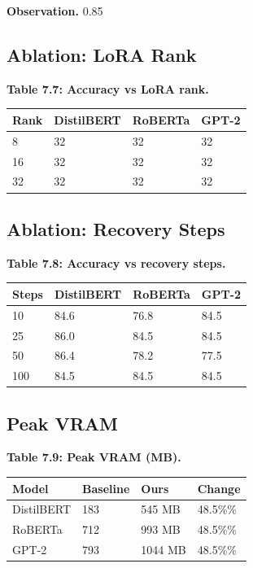 \textbf{Observation.} 0.85

\subsection{Ablation: LoRA Rank}

\textbf{Table 7.7: Accuracy vs LoRA rank.}

\begin{table}[H]
\centering
\small
\begin{tabular}{llll}
\toprule
\textbf{Rank} & \textbf{DistilBERT} & \textbf{RoBERTa} & \textbf{GPT-2} \\
\midrule
8 & 32 & 32 & 32 \\
16 & 32 & 32 & 32 \\
32 & 32 & 32 & 32 \\
\bottomrule
\end{tabular}
\end{table}

\subsection{Ablation: Recovery Steps}

\textbf{Table 7.8: Accuracy vs recovery steps.}

\begin{table}[H]
\centering
\small
\begin{tabular}{llll}
\toprule
\textbf{Steps} & \textbf{DistilBERT} & \textbf{RoBERTa} & \textbf{GPT-2} \\
\midrule
10 & 84.6 & 76.8 & 84.5 \\
25 & 86.0 & 84.5 & 84.5 \\
50 & 86.4 & 78.2 & 77.5 \\
100 & 84.5 & 84.5 & 84.5 \\
\bottomrule
\end{tabular}
\end{table}

\subsection{Peak VRAM}

\textbf{Table 7.9: Peak VRAM (MB).}

\begin{table}[H]
\centering
\small
\begin{tabular}{llll}
\toprule
\textbf{Model} & \textbf{Baseline} & \textbf{Ours} & \textbf{Change} \\
\midrule
DistilBERT & 183 & 545 MB & 48.5\%\% \\
RoBERTa & 712 & 993 MB & 48.5\%\% \\
GPT-2 & 793 & 1044 MB & 48.5\%\% \\
\bottomrule
\end{tabular}
\end{table}

